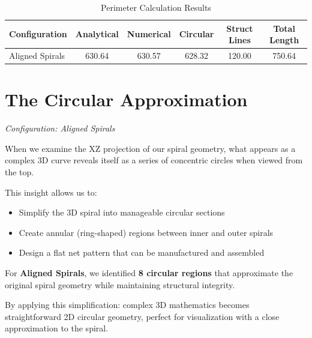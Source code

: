 \documentclass{article}%
\begin{document}
\begin{table}[h!]%
\caption{Perimeter Calculation Results}%
\begin{center}%
\begin{tabular}{@{}|l|c|c|c|c|c|@{}}%
\toprule%
\midrule%
\textbf{Configuration}&\textbf{Analytical}&\textbf{Numerical}&\textbf{Circular}&\textbf{Struct Lines}&\textbf{Total Length}\\%
\midrule%
Aligned Spirals&630.64&630.57&628.32&120.00&750.64\\%
\midrule\bottomrule%
%
\end{tabular}%
\end{center}%
\end{table}

%
\vspace{1cm}

%
\newpage%
\section{The Circular Approximation}%
\label{sec:TheCircularApproximation}%
{\large\itshape\color{accentcolor} Configuration: Aligned Spirals}%
\\[0.5cm]%
\begin{storybox}%
When we examine the XZ projection of our spiral geometry, what appears as a complex 3D curve 
            reveals itself as a series of concentric circles when viewed from the top.

            This insight allows us to:
            \begin{itemize}
                \item Simplify the 3D spiral into manageable circular sections
                \item Create annular (ring-shaped) regions between inner and outer spirals
                \item Design a flat net pattern that can be manufactured and assembled
            \end{itemize}

            For \textbf{Aligned Spirals}, we identified \textbf{8 circular regions} that approximate
            the original spiral geometry while maintaining structural integrity.

            By applying this simplification: complex 3D mathematics becomes
            straightforward 2D circular geometry, perfect for visualization with a close approximation to the spiral.%
\end{storybox}%
\vspace{1cm}%
\end{document}
